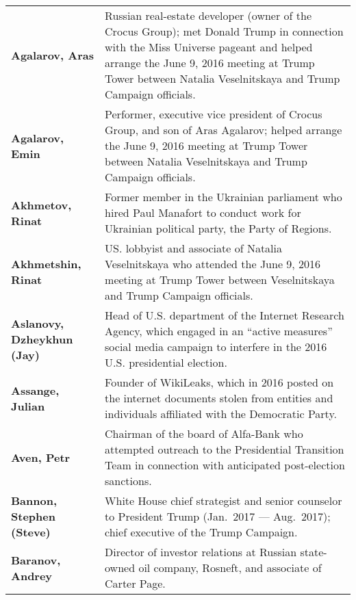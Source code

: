 \begin{longtable}{ p{} p{} }

    \textbf{Agalarov, Aras} & Russian real-estate developer (owner of the Crocus Group); met Donald Trump in connection with the Miss Universe pageant and helped arrange the June 9, 2016 meeting at Trump Tower between Natalia Veselnitskaya and Trump Campaign officials. \\

    \textbf{Agalarov, Emin} & Performer, executive vice president of Crocus Group, and son of Aras Agalarov; helped arrange the June 9, 2016 meeting at Trump Tower between Natalia Veselnitskaya and Trump Campaign officials. \\

    \textbf{Akhmetov, Rinat} & Former member in the Ukrainian parliament who hired Paul Manafort to conduct work for Ukrainian political party, the Party of Regions. \\

    \textbf{Akhmetshin, Rinat} & US. lobbyist and associate of Natalia Veselnitskaya who attended the June 9, 2016 meeting at Trump Tower between Veselnitskaya and Trump Campaign officials. \\

    \textbf{Aslanovy, Dzheykhun (Jay)} & Head of U.S. department of the Internet Research Agency, which engaged in an ``active measures'' social media campaign to interfere in the 2016 U.S. presidential election. \\

    \textbf{Assange, Julian} & Founder of WikiLeaks, which in 2016 posted on the internet documents stolen from entities and individuals affiliated with the Democratic Party. \\

    \textbf{Aven, Petr} & Chairman of the board of Alfa-Bank who attempted outreach to the Presidential Transition Team in connection with anticipated post-election sanctions. \\

    \textbf{Bannon, Stephen (Steve)} & White House chief strategist and senior counselor to President Trump (Jan.~2017 — Aug.~2017); chief executive of the Trump Campaign. \\

    \textbf{Baranov, Andrey} & Director of investor relations at Russian state-owned oil company, Rosneft, and associate of Carter Page. \\


\end{longtable}
